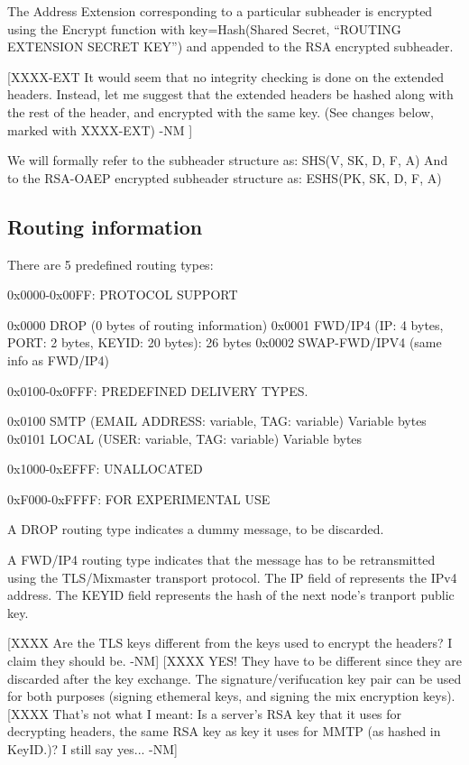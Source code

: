 The Address Extension corresponding to a particular subheader is
encrypted using the Encrypt function with key=Hash(Shared Secret,
``ROUTING EXTENSION SECRET KEY'') and appended to the RSA encrypted
subheader.

[XXXX-EXT It would seem that no integrity checking is done on the extended
      headers.  Instead, let me suggest that the extended headers be
      hashed along with the rest of the header, and encrypted with the 
      same key.  (See changes below, marked with XXXX-EXT) -NM ]

We will formally refer to the subheader structure as:
SHS(V, SK, D, F, A)
And to the RSA-OAEP encrypted subheader structure as:
ESHS(PK, SK, D, F, A)

\subsection{Routing information}

There are 5 predefined routing types:

0x0000-0x00FF: PROTOCOL SUPPORT

0x0000 DROP    (0 bytes of routing information)
0x0001 FWD/IP4 (IP: 4 bytes, PORT: 2 bytes, KEYID: 20 bytes): 26 bytes
0x0002 SWAP-FWD/IPV4 (same info as FWD/IP4)

0x0100-0x0FFF: PREDEFINED DELIVERY TYPES.

0x0100 SMTP   (EMAIL ADDRESS: variable, TAG: variable) Variable bytes
0x0101 LOCAL  (USER: variable, TAG: variable) Variable bytes

0x1000-0xEFFF: UNALLOCATED

0xF000-0xFFFF: FOR EXPERIMENTAL USE

A DROP routing type indicates a dummy message, to be discarded.

A FWD/IP4 routing type indicates that the message has to be
retransmitted using the TLS/Mixmaster transport protocol. The IP field
of represents the IPv4 address.  The KEYID field represents the hash of
the next node's tranport public key.

[XXXX Are the TLS keys different from the keys used to encrypt the
      headers?  I claim they should be. -NM]
[XXXX YES! They have to be different since they are discarded after
      the key exchange. The signature/verifucation key pair can be
      used for both purposes (signing ethemeral keys, and signing the
      mix encryption keys).
[XXXX That's not what I meant:  Is a server's RSA key that it uses 
      for decrypting headers, the same RSA key as key it uses for
      MMTP (as hashed in KeyID.)?  I still say yes... -NM]

